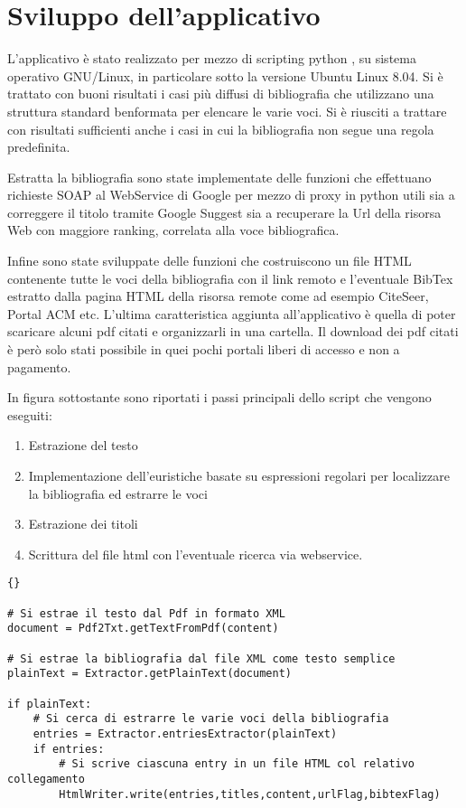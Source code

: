\section{Sviluppo dell'applicativo} \label{software}

L'applicativo è stato realizzato per mezzo di scripting python \cite{pydoc}, su sistema operativo GNU/Linux, in particolare sotto la versione Ubuntu Linux 8.04. Si è trattato con buoni risultati i casi più diffusi di bibliografia che utilizzano una struttura standard benformata per elencare le varie voci. Si è riusciti a trattare con risultati sufficienti anche i casi in cui la bibliografia non segue una regola predefinita.

Estratta la bibliografia sono state implementate delle funzioni che effettuano richieste SOAP al WebService di Google \cite{GWS} per mezzo di proxy in python \cite{ibm-py-ws} utili sia a correggere il titolo tramite Google Suggest sia a recuperare la Url della risorsa Web con maggiore ranking, correlata alla voce bibliografica. 

Infine sono state sviluppate delle funzioni che costruiscono un file HTML contenente tutte le voci della bibliografia con il link remoto e l'eventuale BibTex estratto dalla pagina HTML della risorsa remote come ad esempio CiteSeer, Portal ACM etc. L'ultima caratteristica aggiunta all'applicativo è quella di poter scaricare alcuni pdf citati e organizzarli in una cartella. Il download dei pdf citati è però solo stati possibile in quei pochi portali liberi di accesso e non a pagamento.

In figura sottostante sono riportati i passi principali dello script che vengono eseguiti:
\begin{enumerate}
	\item Estrazione del testo
	\item Implementazione dell'euristiche basate su espressioni regolari per localizzare la bibliografia ed estrarre le voci
	\item Estrazione dei titoli
	\item Scrittura del file html con l'eventuale ricerca via webservice. 
\end{enumerate}


\begin{lstlisting}[frame=r,caption=Il File principale - pdftoref.py ,breaklines=true,basicstyle=\small]{}

# Si estrae il testo dal Pdf in formato XML
document = Pdf2Txt.getTextFromPdf(content)

# Si estrae la bibliografia dal file XML come testo semplice
plainText = Extractor.getPlainText(document)

if plainText:
	# Si cerca di estrarre le varie voci della bibliografia 
	entries = Extractor.entriesExtractor(plainText)
	if entries:
		# Si scrive ciascuna entry in un file HTML col relativo collegamento
		HtmlWriter.write(entries,titles,content,urlFlag,bibtexFlag)

\end{lstlisting}

